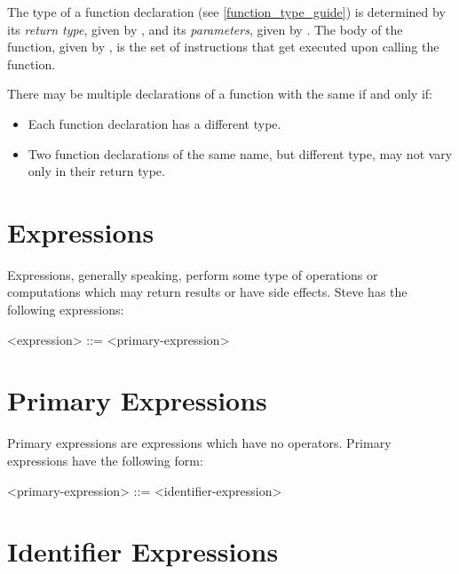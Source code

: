 The type of a function declaration (see \ref{function_type_guide}) is determined by its \textit{return type}, given by , and its \textit{parameters}, given by . The body of the function, given by , is the set of instructions that get executed upon calling the function.

There may be multiple declarations of a function with the same  if and only if:

\begin{itemize}
\item Each function declaration has a different type.
\item Two function declarations of the same name, but different type, may not vary only in their return type.
\end{itemize} 

\section{Expressions} \label{expr_guide}

Expressions, generally speaking, perform some type of operations or computations which may return results or have side effects. Steve has the following expressions:

\begin{minip}
\begin{grammar}
<expression> ::=
<primary-expression>
\end{grammar}
\end{minip}

\section{Primary Expressions} \label{primary_expr_guide}

Primary expressions are expressions which have no operators. Primary expressions have the following form:

\begin{minip}
\begin{grammar}
<primary-expression> ::= 
<identifier-expression>
\end{grammar}
\end{minip}

\section{Identifier Expressions} \label{id_expr_guide}

